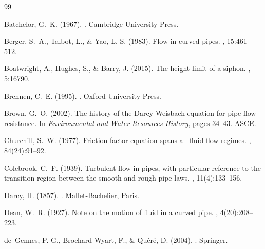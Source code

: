 \documentclass[11pt,a4paper]{article}
\theoremstyle{definition}
\begin{document}

\begin{thebibliography}{99}

Batchelor, G.~K. (1967).
.
\newblock Cambridge University Press.

Berger, S.~A., Talbot, L., \& Yao, L.-S. (1983).
\newblock Flow in curved pipes.
, 15:461--512.

Boatwright, A., Hughes, S., \& Barry, J. (2015).
\newblock The height limit of a siphon.
, 5:16790.

Brennen, C.~E. (1995).
.
\newblock Oxford University Press.

Brown, G.~O. (2002).
\newblock The history of the {D}arcy-{W}eisbach equation for pipe flow resistance.
\newblock In {\em Environmental and Water Resources History}, pages 34--43. ASCE.

Churchill, S.~W. (1977).
\newblock Friction-factor equation spans all fluid-flow regimes.
, 84(24):91--92.

Colebrook, C.~F. (1939).
\newblock Turbulent flow in pipes, with particular reference to the transition region between the smooth and rough pipe laws.
, 11(4):133--156.

Darcy, H. (1857).
.
\newblock Mallet-Bachelier, Paris.

Dean, W.~R. (1927).
\newblock Note on the motion of fluid in a curved pipe.
, 4(20):208--223.

de~Gennes, P.-G., Brochard-Wyart, F., \& Qu\'{e}r\'{e}, D. (2004).
.
\newblock Springer.


\end{thebibliography}
\end{document}
